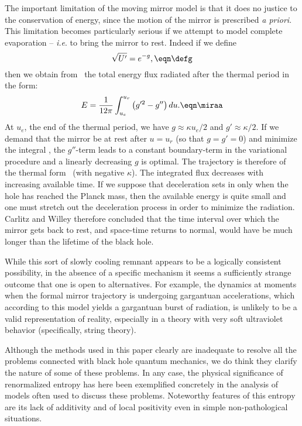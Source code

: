 



The important limitation of the moving mirror model is that it
does no justice to the conservation of energy, since the motion of
the mirror is prescribed {\it a priori}.  This limitation becomes
particularly serious if we attempt to model complete evaporation
-- {\it i.e}. to bring the mirror to rest.   Indeed
if we define
$$\sqrt{U'}=e^{-g},
	\eqn\defg$$
then we obtain from \tmunu\
the total energy flux radiated after the thermal
period in the form:
$$E={1 \over 12 \pi} \int_{u_e}^{u_r} \left( g'^2 -g'' \right) du.
	\eqn\miraa$$
At $u_e$, the end of the thermal period, we have $g \approx \kappa u_e/2$
and $g' \approx \kappa/2$. If we demand that the  mirror be at rest after
$u=u_r$ (so that $g=g'=0$) and minimize the integral \miraa , the $g''$-term
leads to a constant boundary-term in the variational procedure and a
linearly decreasing $g$ is optimal. The trajectory is therefore of
the thermal form \trath\ (with negative $\kappa$).
The integrated flux
decreases with increasing available time.
If we suppose that deceleration sets in only when the hole
has reached the Planck mass, then the available energy is quite
small and one must stretch out the deceleration process in order
to minimize the radiation.
Carlitz and Willey therefore concluded
that the time interval over
which the mirror gets back to rest, and  space-time returns to normal,
would have be much longer than the lifetime of the black hole.

While this sort of slowly cooling remnant appears to be a logically
consistent possibility, in the absence of a specific mechanism
it seems a sufficiently strange outcome that one is open to
alternatives.  For example, the dynamics at moments when the
formal mirror trajectory is undergoing gargantuan accelerations, which
according to this model yields a gargantuan burst of radiation, is
unlikely to be a valid representation of reality, especially in a theory
with very soft ultraviolet behavior (specifically, string theory).

Although the methods used in this paper clearly are inadequate to
resolve all
the problems connected with black hole quantum mechanics, we do think they
clarify the nature of some of these problems.  In any case,
the
physical significance of renormalized entropy has here been
exemplified concretely in
the analysis of models often used to discuss these problems.
Noteworthy features of this entropy are its lack of additivity and of
local
positivity even in simple non-pathological situations.


